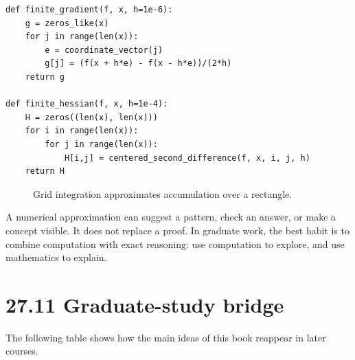\documentclass[11pt]{article}
\begin{document}
\begin{lstlisting}[style=pythonstyle,caption={Finite differences for gradients and Hessians.}]
def finite_gradient(f, x, h=1e-6):
    g = zeros_like(x)
    for j in range(len(x)):
        e = coordinate_vector(j)
        g[j] = (f(x + h*e) - f(x - h*e))/(2*h)
    return g

def finite_hessian(f, x, h=1e-4):
    H = zeros((len(x), len(x)))
    for i in range(len(x)):
        for j in range(len(x)):
            H[i,j] = centered_second_difference(f, x, i, j, h)
    return H
\end{lstlisting}

\begin{figure}[H]
\centering
{}
\caption{Grid integration approximates accumulation over a rectangle.}
\end{figure}

\begin{warningbox}
A numerical approximation can suggest a pattern, check an answer, or make a concept visible. It does not replace a proof. In graduate work, the best habit is to combine computation with exact reasoning: use computation to explore, and use mathematics to explain.
\end{warningbox}

\section*{27.11 Graduate-study bridge}

The following table shows how the main ideas of this book reappear in later courses.
\end{document}
